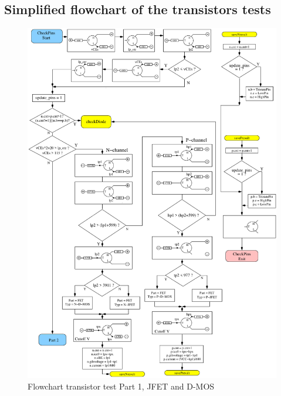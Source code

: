 \subsection{Simplified flowchart of the transistors tests}

\begin{figure}[H]
\centering
\includegraphics[width=.8\textwidth]{../FIG/CheckSemi1.pdf}
\caption{Flowchart transistor test Part 1, JFET and D-MOS}
\label{fig:ChkSemi1}
\end{figure}

